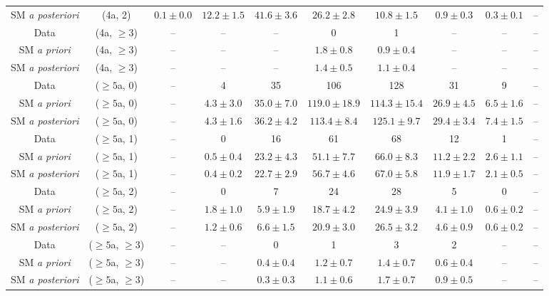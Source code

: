 \begin{table}[h!]
{\begin{tabular}{cccccccccc}
	SM \textit{a posteriori} & (4a, 2) & $0.1\pm 0.0$ & $12.2\pm 1.5$ & $41.6\pm 3.6$ & $26.2\pm 2.8$ & $10.8\pm 1.5$ & $0.9\pm 0.3$ & $0.3\pm 0.1$ & -- \\[0.5ex] 
	Data & (4a, $\ge3$) & -- & -- & -- & 0 & 1 & -- & -- & -- \\[0.5ex] 
	SM \textit{a priori} & (4a, $\ge3$) & -- & -- & -- & $1.8\pm 0.8$ & $0.9\pm 0.4$ & -- & -- & -- \\[0.5ex] 
	SM \textit{a posteriori} & (4a, $\ge3$) & -- & -- & -- & $1.4\pm 0.5$ & $1.1\pm 0.4$ & -- & -- & -- \\[0.5ex] 
	Data & ($\ge5$a, 0) & -- & 4 & 35 & 106 & 128 & 31 & 9 & -- \\[0.5ex] 
	SM \textit{a priori} & ($\ge5$a, 0) & -- & $4.3\pm 3.0$ & $35.0\pm 7.0$ & $119.0\pm 18.9$ & $114.3\pm 15.4$ & $26.9\pm 4.5$ & $6.5\pm 1.6$ & -- \\[0.5ex] 
	SM \textit{a posteriori} & ($\ge5$a, 0) & -- & $4.3\pm 1.6$ & $36.2\pm 4.2$ & $113.4\pm 8.4$ & $125.1\pm 9.7$ & $29.4\pm 3.4$ & $7.4\pm 1.5$ & -- \\[0.5ex] 
	Data & ($\ge5$a, 1) & -- & 0 & 16 & 61 & 68 & 12 & 1 & -- \\[0.5ex] 
	SM \textit{a priori} & ($\ge5$a, 1) & -- & $0.5\pm 0.4$ & $23.2\pm 4.3$ & $51.1\pm 7.7$ & $66.0\pm 8.3$ & $11.2\pm 2.2$ & $2.6\pm 1.1$ & -- \\[0.5ex] 
	SM \textit{a posteriori} & ($\ge5$a, 1) & -- & $0.4\pm 0.2$ & $22.7\pm 2.9$ & $56.7\pm 4.6$ & $67.0\pm 5.8$ & $11.9\pm 1.7$ & $2.1\pm 0.5$ & -- \\[0.5ex] 
	Data & ($\ge5$a, 2) & -- & 0 & 7 & 24 & 28 & 5 & 0 & -- \\[0.5ex] 
	SM \textit{a priori} & ($\ge5$a, 2) & -- & $1.8\pm 1.0$ & $5.9\pm 1.9$ & $18.7\pm 4.2$ & $24.9\pm 3.9$ & $4.1\pm 1.0$ & $0.6\pm 0.2$ & -- \\[0.5ex] 
	SM \textit{a posteriori} & ($\ge5$a, 2) & -- & $1.2\pm 0.6$ & $6.6\pm 1.5$ & $20.9\pm 3.0$ & $26.5\pm 3.2$ & $4.6\pm 0.9$ & $0.6\pm 0.2$ & -- \\[0.5ex] 
	Data & ($\ge5$a, $\ge3$) & -- & -- & 0 & 1 & 3 & 2 & -- & -- \\[0.5ex] 
	SM \textit{a priori} & ($\ge5$a, $\ge3$) & -- & -- & $0.4\pm 0.4$ & $1.2\pm 0.7$ & $1.4\pm 0.7$ & $0.6\pm 0.4$ & -- & -- \\[0.5ex] 
	SM \textit{a posteriori} & ($\ge5$a, $\ge3$) & -- & -- & $0.3\pm 0.3$ & $1.1\pm 0.6$ & $1.7\pm 0.7$ & $0.9\pm 0.5$ & -- & -- \\[0.5ex] 
	\hline
	\hline
\end{tabular}}
\end{table}
